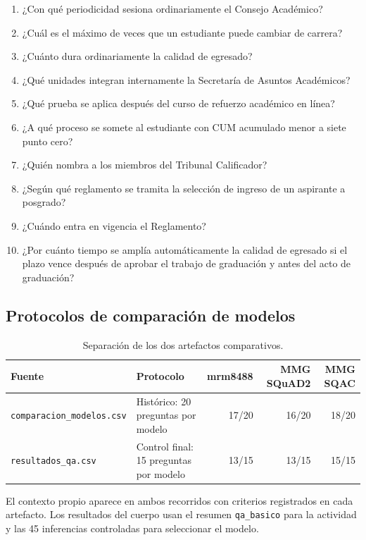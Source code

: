 \documentclass[12pt,letterpaper]{article}
\begin{document}
\begin{enumerate}\small
  \item ¿Con qué periodicidad sesiona ordinariamente el Consejo Académico?
  \item ¿Cuál es el máximo de veces que un estudiante puede cambiar de carrera?
  \item ¿Cuánto dura ordinariamente la calidad de egresado?
  \item ¿Qué unidades integran internamente la Secretaría de Asuntos
  Académicos?
  \item ¿Qué prueba se aplica después del curso de refuerzo académico en línea?
  \item ¿A qué proceso se somete al estudiante con CUM acumulado menor a siete
  punto cero?
  \item ¿Quién nombra a los miembros del Tribunal Calificador?
  \item ¿Según qué reglamento se tramita la selección de ingreso de un
  aspirante a posgrado?
  \item ¿Cuándo entra en vigencia el Reglamento?
  \item ¿Por cuánto tiempo se amplía automáticamente la calidad de egresado si
  el plazo vence después de aprobar el trabajo de graduación y antes del acto
  de graduación?
\end{enumerate}

\subsection{Protocolos de comparación de modelos}

\begin{table}[!htbp]
\centering
\small
\caption{Separación de los dos artefactos comparativos.}
\begin{tabularx}{\linewidth}{@{}lYrrr@{}}
\toprule
\textbf{Fuente} & \textbf{Protocolo} & \textbf{mrm8488} & \textbf{MMG SQuAD2} & \textbf{MMG SQAC}\\
\midrule
\texttt{comparacion\_modelos.csv} & Histórico: 20 preguntas por modelo &
17/20 & 16/20 & 18/20\\
\texttt{resultados\_qa.csv} & Control final: 15 preguntas por modelo &
13/15 & 13/15 & 15/15\\
\bottomrule
\end{tabularx}
\end{table}

El contexto propio aparece en ambos recorridos con criterios registrados en
cada artefacto. Los resultados del cuerpo usan el resumen
\texttt{qa\_basico} para la actividad y las 45 inferencias controladas para
seleccionar el modelo.
\end{document}
